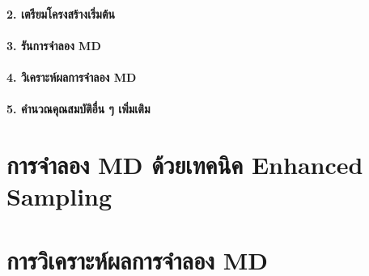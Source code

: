 \paragraph{2. เตรียมโครงสร้างเริ่มต้น}

\paragraph{3. รันการจำลอง MD}

\paragraph{4. วิเคราะห์ผลการจำลอง MD}

\paragraph{5. คำนวณคุณสมบัติอื่น ๆ เพิ่มเติม}

\section{การจำลอง MD ด้วยเทคนิค Enhanced Sampling}

\section{การวิเคราะห์ผลการจำลอง MD}

